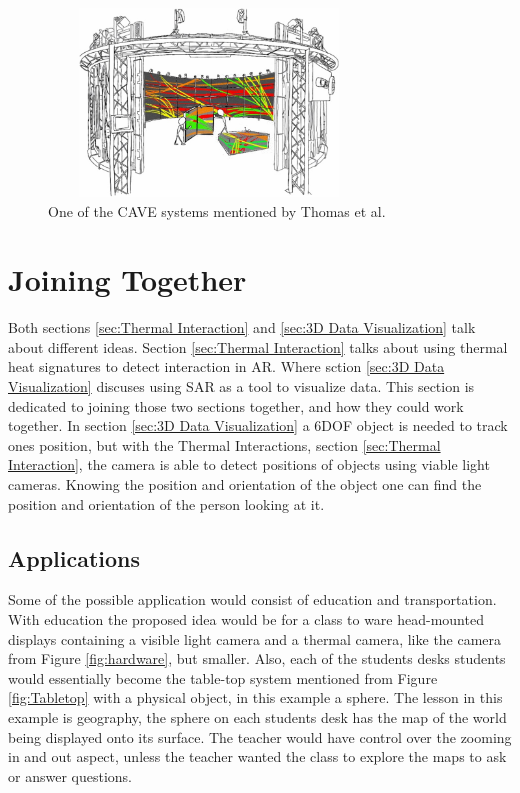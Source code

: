 \documentclass{sig-alternate}
\begin{document}
\begin{figure}
	\includegraphics[width=8.5cm, height=5cm]{Cave}
	\caption{One of the CAVE systems mentioned by Thomas et al. \cite{3D}}
	\label{fig:Cave}
\end{figure}  

\section{Joining Together}
\label{sec:Joining Together}
Both sections \ref{sec:Thermal Interaction} and \ref{sec:3D Data Visualization} talk about different ideas. Section \ref{sec:Thermal Interaction} talks about using thermal heat signatures to detect interaction in AR. Where sction \ref{sec:3D Data Visualization} discuses using SAR as a tool to visualize data. This section is dedicated to joining those two sections together, and how they could work together. In section \ref{sec:3D Data Visualization} a 6DOF object is needed to track ones position, but with the Thermal Interactions, section \ref{sec:Thermal Interaction}, the camera is able to detect positions of objects using viable light cameras. Knowing the position and orientation of the object one can find the position and orientation of the person looking at it.  

\subsection{Applications}
\label{Applications}
Some of the possible application would consist of education and transportation. With education the proposed idea would be for a class to ware head-mounted displays containing a visible light camera and a thermal camera, like the camera from Figure \ref{fig:hardware}, but smaller. Also, each of the students desks students would essentially become the table-top system mentioned from Figure \ref{fig:Tabletop} with a physical object, in this example a sphere. The lesson in this example is geography, the sphere on each students desk has the map of the world being displayed onto its surface. The teacher would have control over the zooming in and out aspect, unless the teacher wanted the class to explore the maps to ask or answer questions.
\end{document}
